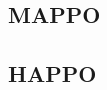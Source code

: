 \subsection*{MAPPO}
\subsection*{HAPPO}
\subsection*{}
\subsection*{}


\begin{comment}



\cite*{zhong2024} for HARL

\end{comment}